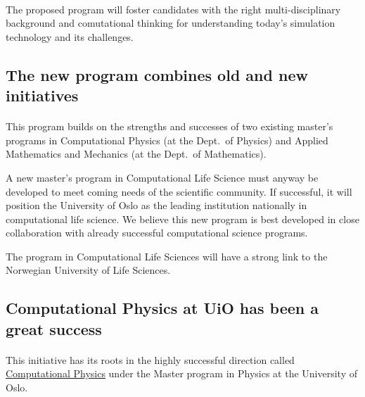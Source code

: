 \documentclass[%
oneside,                 %
final,                   %
10pt]{article}
\begin{document}
\paragraph{}
The proposed program will foster candidates with the right
multi-disciplinary background and comutational thinking for
understanding today's simulation technology and its challenges.




\subsection*{The new program combines old and new initiatives}

\paragraph{}

This program builds on the strengths and successes of two existing master's
programs in Computational Physics (at the Dept.~of Physics) and
Applied Mathematics and Mechanics (at the Dept.~of Mathematics).

A new master's program in Computational Life Science must anyway be developed to
meet coming needs of the scientific community. If successful, it will
position the University of Oslo as the leading institution
nationally in computational life science. We believe this new program is
best developed in close collaboration with already successful
computational science programs.

The program in Computational Life Sciences will have a strong
link to the Norwegian University of Life Sciences.




\subsection*{Computational Physics at UiO has been a great success}

\paragraph{}

This initiative has its roots in the highly successful direction called \href{{http://www.uio.no/english/studies/programmes/physics-master/programme-options/computational/index.html}}{Computational Physics}
under the Master program in Physics at the University of Oslo.
\end{document}
